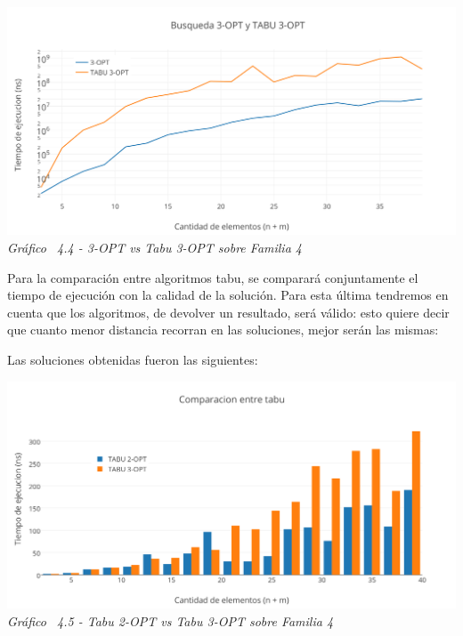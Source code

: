 \vspace*{0.3cm} \vspace*{0.3cm}
  \begin{center}
 \includegraphics[scale=0.5]{./EJ4/medicion3optgym0.png}\\
 {            \textit{Gráfico \ 4.4 - 3-OPT vs Tabu 3-OPT sobre Familia 4}}
  \end{center}
  \vspace*{0.3cm}
  
Para la comparación entre algoritmos tabu, se comparará conjuntamente el tiempo de ejecución con la calidad de la solución. Para esta última tendremos en cuenta que los algoritmos, de devolver un resultado, será válido: esto quiere decir que cuanto menor distancia recorran en las soluciones, mejor serán las mismas:

Las soluciones obtenidas fueron las siguientes:

\vspace*{0.3cm} \vspace*{0.3cm}
  \begin{center}
 \includegraphics[scale=0.5]{./EJ4/comparativogym0.png}\\
 {            \textit{Gráfico \ 4.5 - Tabu 2-OPT vs Tabu 3-OPT sobre Familia 4}}
  \end{center}
  \vspace*{0.3cm}


